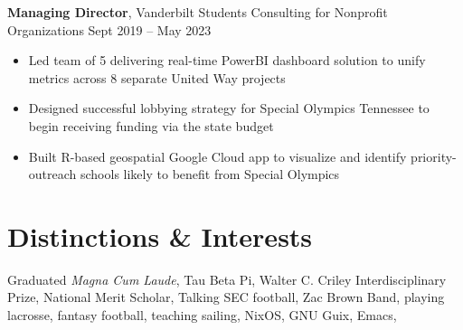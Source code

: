 \documentclass[10.5pt]{article}
\newcommand{\postlinebreakspacing} {
  \vspace{0.4ex}
}
\newcommand{\roleheader}[3]{
  \postlinebreakspacing
  \textbf{#1}, #2 \hfill #3
}
\newcommand{\itemizedrole}[5]{
  \roleheader{#1}{#2}{#3 -- #4}

  \begin{itemize}
    #5
  \end{itemize}
}
\begin{document}
\itemizedrole
{Managing Director}
{Vanderbilt Students Consulting for Nonprofit Organizations}
{Sept 2019}
{May 2023}
{
	\item Led team of 5 delivering real-time PowerBI dashboard solution to unify metrics across 8 separate United Way projects
	\item Designed successful lobbying strategy for Special Olympics Tennessee to begin receiving funding via the state budget
	\item Built R-based geospatial Google Cloud app to visualize and identify priority-outreach schools likely to benefit from Special Olympics
}


\section*{Distinctions \& Interests}
\lines
{
	 {Graduated \textit{Magna Cum Laude}, Tau Beta Pi, Walter C. Criley Interdisciplinary Prize, National Merit Scholar},
	 {Talking SEC football, Zac Brown Band, playing lacrosse, fantasy football, teaching sailing, NixOS, GNU Guix, Emacs},
}
\end{document}
